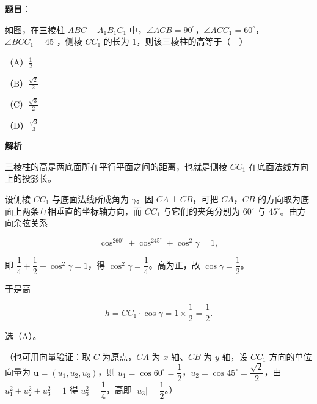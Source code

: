 \begin{answer}

\textbf{题目}：

如图，在三棱柱 $ABC-A_1B_1C_1$ 中，$\angle ACB=90^\circ$，$\angle ACC_1=60^\circ$，$\angle BCC_1=45^\circ$，侧棱 $CC_1$ 的长为 $1$，则该三棱柱的高等于（　）

（A）$\frac12$

（B）$\frac{\sqrt2}{2}$

（C）$\frac{\sqrt3}{2}$

（D）$\frac{\sqrt3}{3}$
\nopagebreak[4]
\begin{center}\end{center}
\nopagebreak[4]
\textbf{解析}

三棱柱的高是两底面所在平行平面之间的距离，也就是侧棱 $CC_1$ 在底面法线方向上的投影长。

设侧棱 $CC_1$ 与底面法线所成角为 $\gamma$。因 $CA\perp CB$，可把 $CA$，$CB$ 的方向取为底面上两条互相垂直的坐标轴方向，而 $CC_1$ 与它们的夹角分别为 $60^\circ$ 与 $45^\circ$。由方向余弦关系

\nopagebreak[4]
\[\cos^260^\circ+\cos^245^\circ+\cos^2\gamma=1,\]

即 $\dfrac14+\dfrac12+\cos^2\gamma=1$，得 $\cos^2\gamma=\dfrac14$。高为正，故 $\cos\gamma=\dfrac12$。

于是高

\nopagebreak[4]
\[h=CC_1\cdot\cos\gamma=1\times\frac12=\frac12.\]

选（A）。

（也可用向量验证：取 $C$ 为原点，$CA$ 为 $x$ 轴、$CB$ 为 $y$ 轴，设 $CC_1$ 方向的单位向量为 $\boldsymbol u=(u_1,u_2,u_3)$，则 $u_1=\cos60^\circ=\dfrac12$，$u_2=\cos45^\circ=\dfrac{\sqrt2}{2}$，由 $u_1^2+u_2^2+u_3^2=1$ 得 $u_3^2=\dfrac14$，高即 $|u_3|=\dfrac12$。）


\end{answer}
